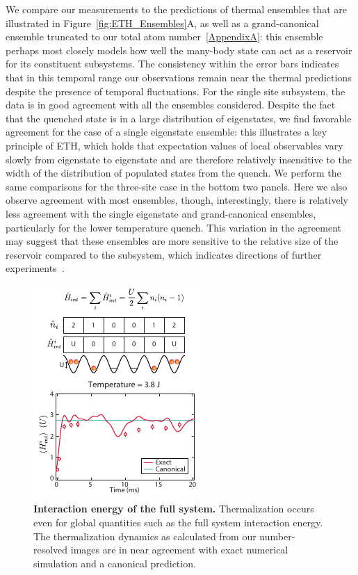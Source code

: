 We compare our measurements to the predictions of thermal ensembles that are illustrated in Figure~\ref{fig:ETH_Ensembles}A, as well as a grand-canonical ensemble truncated to our total atom number~\ref{AppendixA}: this ensemble perhaps most closely models how well the many-body state can act as a reservoir for its constituent subsystems. The consistency within the error bars indicates that in this temporal range our observations remain near the thermal predictions despite the presence of temporal fluctuations. For the single site subsystem, the data is in good agreement with all the ensembles considered. Despite the fact that the quenched state is in a large distribution of eigenstates, we find favorable agreement for the case of a single eigenstate ensemble: this illustrates a key principle of ETH, which holds that expectation values of local observables vary slowly from eigenstate to eigenstate and are therefore relatively insensitive to the width of the distribution of populated states from the quench. We perform the same comparisons for the three-site case in the bottom two panels. Here we also observe agreement with most ensembles, though, interestingly, there is relatively less agreement with the single eigenstate and grand-canonical ensembles, particularly for the lower temperature quench. This variation in the agreement may suggest that these ensembles are more sensitive to the relative size of the reservoir compared to the subsystem, which indicates directions of further experiments~\cite{Rigol2012}.

\begin{figure}[t!]
	\centering
	\includegraphics[scale=1.75]{figures/ETH_Eint.pdf}
	\caption{{\bf Interaction energy of the full system. } Thermalization occurs even for global quantities such as the full system interaction energy. The thermalization dynamics as calculated from our number-resolved images are in near agreement with exact numerical simulation and a canonical prediction.}
	\label{fig:ETH_Eint}
\end{figure}

